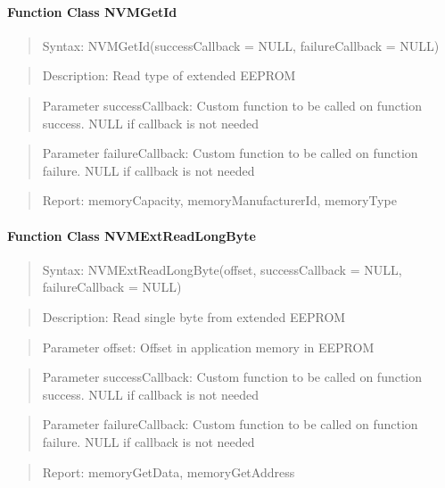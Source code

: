 \paragraph{Function Class NVMGetId}
\begin{quote}Syntax: NVMGetId(successCallback = NULL, failureCallback = NULL)\end{quote}
\begin{quote}Description: Read type of extended EEPROM\end{quote}
\begin{quote}Parameter successCallback: Custom function to be called on function success. NULL if callback is not needed\end{quote}
\begin{quote}Parameter failureCallback: Custom function to be called on function failure. NULL if callback is not needed\end{quote}
\begin{quote}Report: memoryCapacity, memoryManufacturerId, memoryType\end{quote}

\paragraph{Function Class NVMExtReadLongByte}
\begin{quote}Syntax: NVMExtReadLongByte(offset, successCallback = NULL, failureCallback = NULL)\end{quote}
\begin{quote}Description: Read single byte from extended EEPROM\end{quote}
\begin{quote}Parameter offset: Offset in application memory in EEPROM\end{quote}
\begin{quote}Parameter successCallback: Custom function to be called on function success. NULL if callback is not needed\end{quote}
\begin{quote}Parameter failureCallback: Custom function to be called on function failure. NULL if callback is not needed\end{quote}
\begin{quote}Report: memoryGetData, memoryGetAddress\end{quote}

